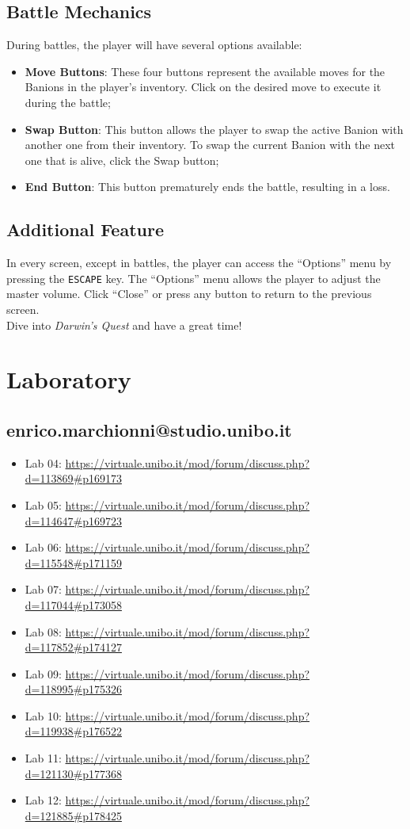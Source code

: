 \documentclass[12pt, a4paper]{report}
\theoremstyle{definition}
\begin{document}
\section{Battle Mechanics}
During battles, the player will have several options available:
\begin{itemize}
  \item \textbf{Move Buttons}: These four buttons represent the available moves for the Banions in the player's inventory. Click on the desired move to execute it during the battle;
  \item \textbf{Swap Button}: This button allows the player to swap the active Banion with another one from their inventory. To swap the current Banion with the next one that is alive, click the Swap button;
  \item \textbf{End Button}: This button prematurely ends the battle, resulting in a loss.
\end{itemize}

\section{Additional Feature}
In every screen, except in battles, the player can access the ``Options'' menu by pressing the \verb|ESCAPE| key.
The ``Options'' menu allows the player to adjust the master volume. Click ``Close'' or press any button to return to the previous screen.\\
Dive into \emph{Darwin's Quest} and have a great time!


\chapter{Laboratory}

\section{enrico.marchionni@studio.unibo.it}

\begin{itemize}
    \item Lab 04: \url{https://virtuale.unibo.it/mod/forum/discuss.php?d=113869#p169173}
    \item Lab 05: \url{https://virtuale.unibo.it/mod/forum/discuss.php?d=114647#p169723}
    \item Lab 06: \url{https://virtuale.unibo.it/mod/forum/discuss.php?d=115548#p171159}
    \item Lab 07: \url{https://virtuale.unibo.it/mod/forum/discuss.php?d=117044#p173058}
    \item Lab 08: \url{https://virtuale.unibo.it/mod/forum/discuss.php?d=117852#p174127}
    \item Lab 09: \url{https://virtuale.unibo.it/mod/forum/discuss.php?d=118995#p175326}
    \item Lab 10: \url{https://virtuale.unibo.it/mod/forum/discuss.php?d=119938#p176522}
    \item Lab 11: \url{https://virtuale.unibo.it/mod/forum/discuss.php?d=121130#p177368}
    \item Lab 12: \url{https://virtuale.unibo.it/mod/forum/discuss.php?d=121885#p178425}
\end{itemize}
\end{document}
